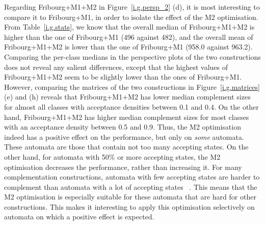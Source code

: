 Regarding Fribourg+M1+M2 in Figure~\ref{i.g.persp_2} (d), it is most interesting to compare it to Fribourg+M1, in order to isolate the effect of the M2 optimisation. From Table~\ref{i.g.stats}, we know that the overall median of Fribourg+M1+M2 is higher than the one of Fribourg+M1 (496 against 482), and the overall mean of Fribourg+M1+M2 is lower than the one of Fribourg+M1 (958.0 against 963.2). Comparing the per-class medians in the perspective plots of the two constructions does not reveal any salient differences, except that the highest values of Fribourg+M1+M2 seem to be slightly lower than the ones of Fribourg+M1. However, comparing the matrices of the two constructions in Figure~\ref{i.g.matrices} (e) and (h) reveals that Fribourg+M1+M2 has lower median complement sizes for almost all classes with acceptance densities between 0.1 and 0.4. On the other hand, Fribourg+M1+M2 has higher median complement sizes for most classes with an acceptance density between 0.5 and 0.9. Thus, the M2 optimisation indeed has a positive effect on the performance, but only on \textit{some} automata. These automata are those that contain not too many accepting states. On the other hand, for automata with 50\% or more accepting states, the M2 optimisation decreases the performance, rather than increasing it. For many complementation constructions, automata with few accepting states are harder to complement than automata with a lot of accepting states ~\cite{2011_tsai}. This means that the M2 optimisation is especially suitable for these automata that are hard for other constructions. This makes it interesting to apply this optimisation selectively on automata on which a positive effect is expected.


